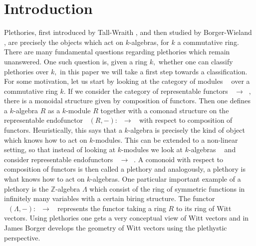 \documentclass[a4paper, 12pt]{amsart}
\DeclareMathOperator{\Algk}{Alg_k}
\DeclareMathOperator{\Modk}{Mod_k}
\newcommand{\ZZ}{\mathbb{Z}}
\numberwithin{equation}{section}
\theoremstyle{definition}
\begin{document}



\section{Introduction}
\noindent Plethories, first introduced by Tall-Wraith \cite{TallWraith}, and then studied by Borger-Wieland \cite{BW}, are precisely the objects which act on $k$-algebras, for $k$ a commutative ring. There are many fundamental questions regarding plethories which remain unanswered. One such question is, given a ring $k,$ whether one can classify plethories over $k,$  in this paper we will take a first step towards a classification.  \\

\noindent For some motivation, let us start by looking at the category of modules $\Modk$ over a commutative ring $k.$  If we consider the category of representable functors $\Modk \rightarrow \Modk,$ there is a monoidal structure given by composition of functors. Then one defines a $k$-algebra $R$ as a $k$-module $R$ together with a comonad structure on the representable endofunctor $\Modk(R,-):\Modk \rightarrow \Modk$ with respect to composition of functors. Heuristically, this says that a $k$-algebra is precisely the kind of object which knows how to act on $k$-modules. This can be extended to a non-linear setting, so that instead of looking at $k$-modules we look at $k$-algebras $\Algk$ and consider representable endofunctors $\Algk \rightarrow \Algk.$ A comonoid with respect to composition of functors is then called a plethory and analogously, a plethory is what knows how to act on $k$-algebras. One particular important example of a plethory is the $\ZZ$-algebra $\Lambda$ which consist of the ring of symmetric functions in infinitely many variables with a certain biring structure. The functor $\Algk(\Lambda,-):\Algk \rightarrow \Algk$  represents the functor taking a ring $R$ to its ring of Witt vectors. Using plethories one gets a very conceptual view of Witt vectors and in \cite{BorgerGeom} James Borger develops the geometry of Witt vectors using the plethystic perspective. \\ 
\end{document}
